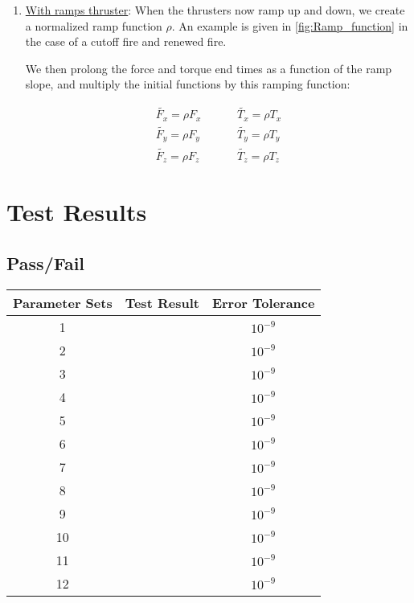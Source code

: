 \begin{enumerate}
	\item{\underline{With ramps thruster}}: When the thrusters now ramp up and down, we create a normalized ramp function $\rho$. An example is given in \ref{fig:Ramp_function} in the case of a cutoff fire and renewed fire. \par
	
	
	
	We then prolong the force and torque end times as a function of the ramp slope, and multiply the initial functions by this ramping function:
	
	\begin{align}
		\tilde{F_x} = \rho F_{x} &\hspace{1cm} \tilde{T_x} =\rho T_{x}  \\ 
		\tilde{F_y} =  \rho F_{y}  &\hspace{1cm} \tilde{T_y} =\rho  T_{y} \\ 
		\tilde{F_z} = \rho F_{z} &\hspace{1cm} \tilde{T_z} =\rho  T_{z} 
	\end{align}
	
\end{enumerate}



\section{Test Results}

\subsection{Pass/Fail}

\begin{center}
	\begin{tabular}{|c|c|c|}
		\hline
		Parameter Sets & Test Result & Error Tolerance \\ \hline \hline
		1  & & $10^{-9}$ \\ \hline
		2  & & $10^{-9}$ \\ \hline
		3  & & $10^{-9}$ \\ \hline
		4  && $10^{-9}$ \\ \hline
		5  && $10^{-9}$ \\ \hline
		6  &  & $10^{-9}$ \\ \hline
		7  && $10^{-9}$ \\ \hline
		8  & & $10^{-9}$ \\ \hline
		9  & & $10^{-9}$ \\ \hline
		10  && $10^{-9}$ \\ \hline
		11  & & $10^{-9}$ \\ \hline
		12  & & $10^{-9}$ \\ 
		\hline
		
	\end{tabular}
\end{center}

